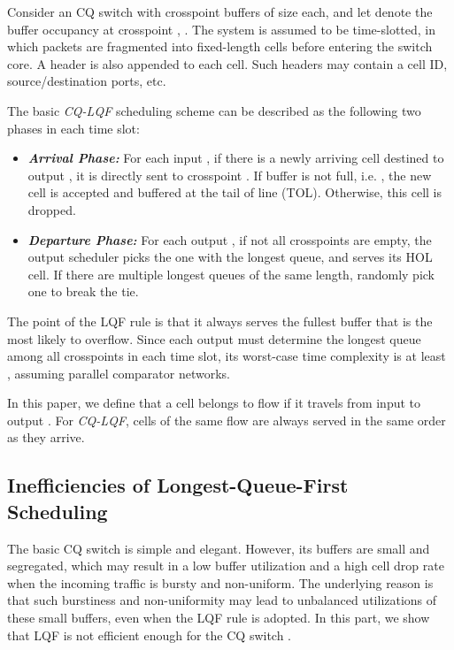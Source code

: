 \documentclass[journal,final,doublecolumn,10pt,twoside]{IEEEtranTCOM} \normalsize
\begin{document}
Consider an  CQ switch with crosspoint buffers of size  each, and let  denote the buffer occupancy at crosspoint , . The system is assumed to be time-slotted, in which packets are fragmented into fixed-length cells before entering the switch core. A header is also appended to each cell. Such headers may contain a cell ID, source/destination ports, etc. 

The basic \emph{CQ-LQF} scheduling scheme can be described as the following two phases in each time slot:


\begin{itemize}
\item
\textbf{\emph{Arrival Phase:}} For each input , if there is a newly arriving cell destined to output , it is directly sent to crosspoint . If buffer  is not full, i.e. , the new cell is accepted and buffered at the tail of line (TOL). Otherwise, this cell is dropped.

\item
\textbf{\emph{Departure Phase:}} For each output , if not all crosspoints  are empty, the output scheduler picks the one with the longest queue, and serves its HOL cell. If there are multiple longest queues of the same length, randomly pick one to break the tie.
\end{itemize}


The point of the LQF rule is that it always serves the fullest buffer that is the most likely to overflow. Since each output must determine the longest queue among all  crosspoints in each time slot, its worst-case time complexity is at least , assuming parallel comparator networks.

In this paper, we define that a cell belongs to flow  if it travels from input  to output . For \emph{CQ-LQF}, cells of the same flow are always served in the same order as they arrive.

\subsection{Inefficiencies of Longest-Queue-First Scheduling}
\label{sec:inefficiency}

The basic CQ switch is simple and elegant. However, its buffers are small and segregated, which may result in a low buffer utilization and a high cell drop rate when the incoming traffic is bursty and non-uniform. The underlying reason is that such burstiness and non-uniformity may lead to unbalanced utilizations of these small buffers, even when the LQF rule is adopted. In this part, we show that LQF is not efficient enough for the CQ switch
. 
\end{document}
